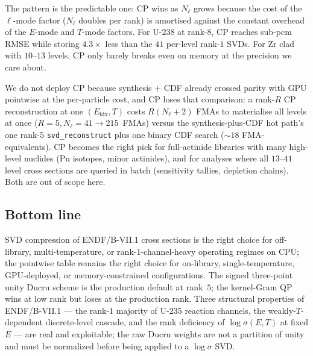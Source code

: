 \noindent
The pattern is the predictable one: CP wins as $N_\ell$
grows because the cost of the $\ell$-mode factor
($N_\ell$ doubles per rank) is amortised against the
constant overhead of the $E$-mode and $T$-mode factors.
For U-$238$ at rank-$8$, CP reaches sub-pcm RMSE while
storing $4.3\times$ less than the $41$ per-level rank-$1$
SVDs. For Zr clad with $10$--$13$ levels, CP only barely
breaks even on memory at the precision we care about.

We do not deploy CP because synthesis $+$ CDF already
crossed parity with GPU pointwise at the per-particle
cost, and CP loses that comparison: a rank-$R$ CP
reconstruction at one $(E_\text{idx}, T)$ costs
$R(N_\ell + 2)$ FMAs to materialise all levels at once
($R = 5, N_\ell = 41 \to 215$~FMAs) versus the
synthesis-plus-CDF hot path's one rank-$5$
\texttt{svd\_reconstruct} plus one binary CDF search
($\sim 18$ FMA-equivalents). CP becomes the right pick
for full-actinide libraries with many high-level
nuclides (Pu isotopes, minor actinides), and for
analyses where all $13$--$41$ level cross sections are
queried in batch (sensitivity tallies, depletion
chains). Both are out of scope here.

\subsection{Bottom line}

SVD compression of ENDF/B-VII.1 cross sections is the
right choice for off-library, multi-temperature, or
rank-$1$-channel-heavy operating regimes on CPU; the
pointwise table remains the right choice for on-library,
single-temperature, GPU-deployed, or memory-constrained
configurations. The signed three-point unity Ducru
scheme is the production default at rank~$5$; the
kernel-Gram QP wins at low rank but loses at the
production rank. Three structural properties of
ENDF/B-VII.1 --- the rank-$1$ majority of U-$235$ reaction
channels, the weakly-$T$-dependent discrete-level
cascade, and the rank deficiency of $\log\sigma(E,T)$ at
fixed $E$ --- are real and exploitable; the raw Ducru
weights are not a partition of unity and must be
normalized before being applied to a $\log\sigma$ SVD.
